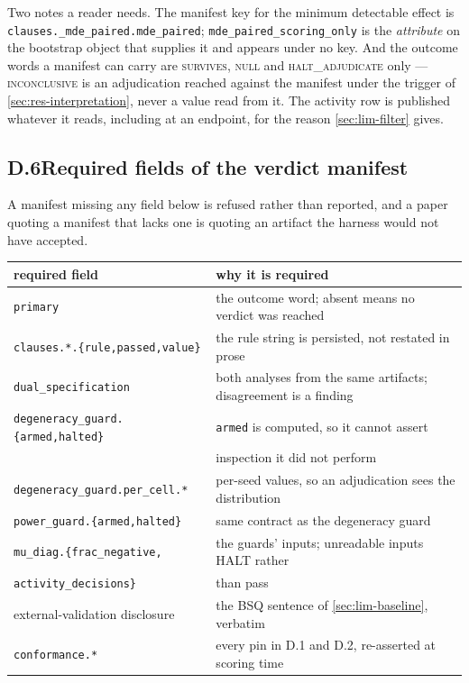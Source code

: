 Two notes a reader needs. The manifest key for the minimum detectable effect is
\texttt{clauses.\_mde\_paired.\allowbreak mde\_paired}; \texttt{mde\_paired\_\allowbreak scoring\_only} is the
\emph{attribute} on the bootstrap object that supplies it and appears under no key. And the
outcome words a manifest can carry are \textsc{survives}, \textsc{null} and
\textsc{halt\_adjudicate} only --- \textsc{inconclusive} is an adjudication reached against the
manifest under the trigger of \cref{sec:res-interpretation}, never a value read from it. The
activity row is published whatever it reads, including at an endpoint, for the reason
\cref{sec:lim-filter} gives.

\subsection*{D.6\quad Required fields of the verdict manifest}

A manifest missing any field below is refused rather than reported, and a paper quoting a manifest
that lacks one is quoting an artifact the harness would not have accepted.

\begin{center}
\small
\begin{tabularx}{\linewidth}{lX}
\toprule
required field & why it is required \\
\midrule
\texttt{primary} & the outcome word; absent means no verdict was reached \\
\texttt{clauses.*.\{rule,passed,value\}} & the rule string is persisted, not restated in prose \\
\texttt{dual\_specification} & both analyses from the same artifacts; disagreement is a finding \\
\texttt{degeneracy\_guard.\{armed,halted\}} & \texttt{armed} is computed, so it cannot assert \\
 & inspection it did not perform \\
\texttt{degeneracy\_guard.per\_cell.*} & per-seed values, so an adjudication sees the distribution \\
\texttt{power\_guard.\{armed,halted\}} & same contract as the degeneracy guard \\
\texttt{mu\_diag.\{frac\_negative,} & the guards' inputs; unreadable inputs HALT rather \\
\quad\texttt{activity\_decisions\}} & than pass \\
external-validation disclosure & the BSQ sentence of \cref{sec:lim-baseline}, verbatim \\
\texttt{conformance.*} & every pin in D.1 and D.2, re-asserted at scoring time \\
\bottomrule
\end{tabularx}
\end{center}

